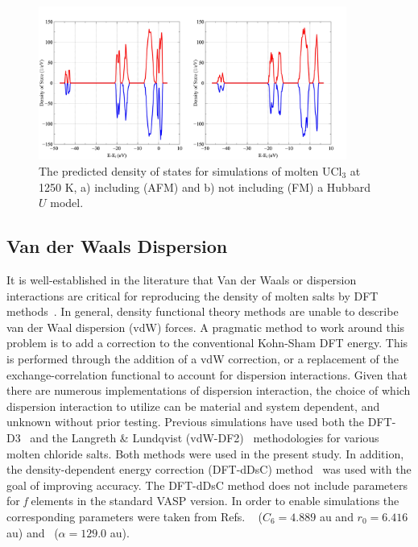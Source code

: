\documentclass[preprint,3p,10pt,onecolumn,number,sort&compress]{elsarticle}
\begin{document}
{\begin{figure}[h]
\centering
\includegraphics[width=0.9\textwidth]{fig2.jpg}
\caption{The predicted density of states for simulations of molten UCl$_3$ at 1250 K, a) including (AFM) and b) not including (FM) a Hubbard $U$ model.} 
\label{fig:DOS}
\end{figure}


\subsection{Van der Waals Dispersion}

It is well-established in the literature that Van der Waals or dispersion interactions are critical for reproducing the density of molten salts by DFT methods~\cite{Li,Nam2014,Nam2015}. In general, density functional theory methods are unable to describe van der Waal dispersion (vdW) forces. A pragmatic method to work around this problem is to add a correction to the conventional Kohn-Sham DFT energy. This is performed through the addition of a vdW correction, or a replacement of the exchange-correlation functional to account for dispersion interactions. Given that there are numerous implementations of dispersion interaction, the choice of which dispersion interaction to utilize can be material and system dependent, and unknown without prior testing. Previous simulations have used both the DFT-D3~\cite{Li,Grimme} and the Langreth \& Lundqvist (vdW-DF2)~\cite{Nam2015,Dion,Klimes} methodologies for various molten chloride salts. Both methods were used in the present study. In addition, the density-dependent energy correction (DFT-dDsC) method~\cite{Steinmann2011,Steinmann2} was used with the goal of improving accuracy. The DFT-dDsC method does not include parameters for \textit{f} elements in the standard VASP version. In order to enable simulations the corresponding parameters were taken from Refs. ~\cite{Kim} ($C_6=4.889$ au and $r_0=6.416$ au) and~\cite{pol} ($\alpha=129.0$ au). %

}
\end{document}
